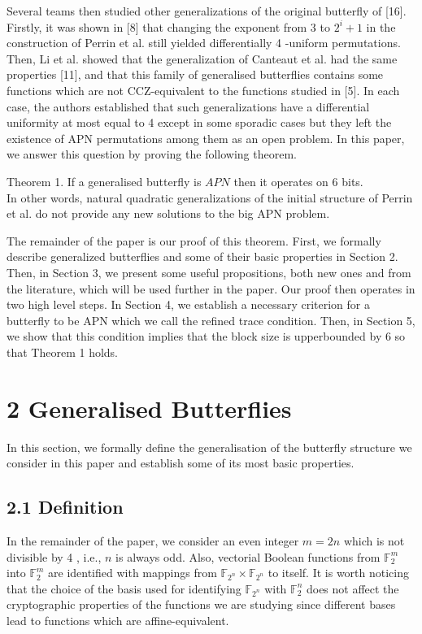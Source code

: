 \documentclass[10pt]{article}
\begin{document}
Several teams then studied other generalizations of the original butterfly of [16]. Firstly, it was shown in [8] that changing the exponent from 3 to $2^{i}+1$ in the construction of Perrin et al. still yielded differentially 4 -uniform permutations. Then, Li et al. showed that the generalization of Canteaut et al. had the same properties [11], and that this family of generalised butterflies contains some functions which are not CCZ-equivalent to the functions studied in [5]. In each case, the authors established that such generalizations have a differential uniformity at most equal to 4 except in some sporadic cases but they left the existence of APN permutations among them as an open problem. In this paper, we answer this question by proving the following theorem.

Theorem 1. If a generalised butterfly is $A P N$ then it operates on 6 bits.\\
In other words, natural quadratic generalizations of the initial structure of Perrin et al. do not provide any new solutions to the big APN problem.

The remainder of the paper is our proof of this theorem. First, we formally describe generalized butterflies and some of their basic properties in Section 2. Then, in Section 3, we present some useful propositions, both new ones and from the literature, which will be used further in the paper. Our proof then operates in two high level steps. In Section 4, we establish a necessary criterion for a butterfly to be APN which we call the refined trace condition. Then, in Section 5, we show that this condition implies that the block size is upperbounded by 6 so that Theorem 1 holds.

\section*{2 Generalised Butterflies}
In this section, we formally define the generalisation of the butterfly structure we consider in this paper and establish some of its most basic properties.

\subsection*{2.1 Definition}
In the remainder of the paper, we consider an even integer $m=2 n$ which is not divisible by 4 , i.e., $n$ is always odd. Also, vectorial Boolean functions from $\mathbb{F}_{2}^{m}$ into $\mathbb{F}_{2}^{m}$ are identified with mappings from $\mathbb{F}_{2^{n}} \times \mathbb{F}_{2^{n}}$ to itself. It is worth noticing that the choice of the basis used for identifying $\mathbb{F}_{2^{n}}$ with $\mathbb{F}_{2}^{n}$ does not affect the cryptographic properties of the functions we are studying since different bases lead to functions which are affine-equivalent.
\end{document}
